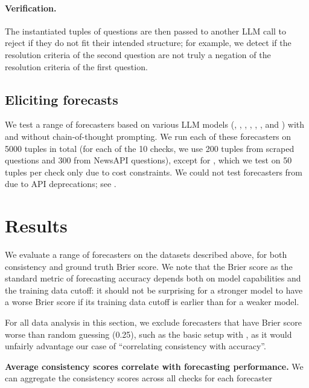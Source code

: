 \paragraph{Verification.}
The instantiated tuples of questions are then passed to another LLM call to reject if they do not fit their intended structure; for example, we detect if the resolution criteria of the second question are not truly a negation of the resolution criteria of the first question.

\subsection{Eliciting forecasts}

We test a range of forecasters based on various LLM models (\gptfouro{}, \gptfouromini{}, \claudesonnet{}, \llamaeight{}, \llamaseventy{}, \llamafourhundred{}, \oonemini{} and \oonepreview{}) with and without chain-of-thought prompting.
We run each of these forecasters on 5000 tuples in total (for each of the 10 checks, we use 200 tuples from scraped questions and 300 from NewsAPI questions), except for \oonepreview{}, which we test on 50 tuples per check only due to cost constraints.
We could not test forecasters from \citet{halawiApproachingHumanLevelForecasting2024} due to API deprecations; see .



\section{Results}
\label{cfc:sec:results}

We evaluate a range of forecasters on the datasets described above, for both consistency and ground truth Brier score.
We note that the Brier score as the standard metric of forecasting accuracy depends both on model capabilities and the training data cutoff: it should not be surprising for a stronger model to have a worse Brier score if its training data cutoff is earlier than for a weaker model.

For all data analysis in this section, we exclude forecasters that have Brier score worse than random guessing (0.25), such as the basic setup with \llamaeight{}, as it would unfairly advantage our case of ``correlating consistency with accuracy''.



\textbf{Average consistency scores correlate  with forecasting performance.}
We can aggregate the consistency scores across all checks for each forecaster 


